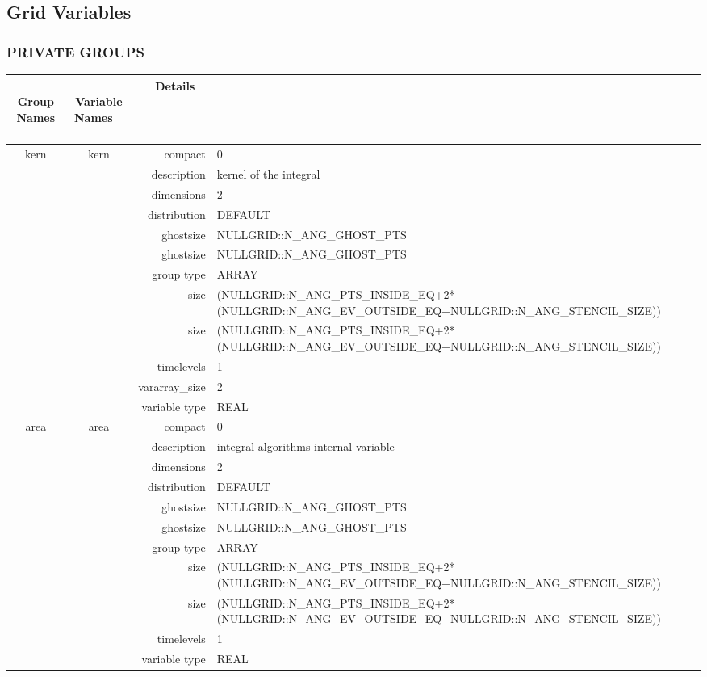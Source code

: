 \subsection*{Grid Variables}
\vspace{5mm}\subsubsection{PRIVATE GROUPS}

\vspace{5mm}

\begin{tabular*}{150mm}{|c|c@{\extracolsep{\fill}}|rl|} \hline 
~ {\bf Group Names} ~ & ~ {\bf Variable Names} ~  &{\bf Details} ~ & ~\\ 
\hline 
kern & kern & compact & 0 \\ 
 &  & description & kernel of the integral \\ 
 &  & dimensions & 2 \\ 
 &  & distribution & DEFAULT \\ 
 &  & ghostsize & NULLGRID::N\_ANG\_GHOST\_PTS \\ 
& ~ & ghostsize & NULLGRID::N\_ANG\_GHOST\_PTS \\ 
 &  & group type & ARRAY \\ 
 &  & size & (NULLGRID::N\_ANG\_PTS\_INSIDE\_EQ+2*(NULLGRID::N\_ANG\_EV\_OUTSIDE\_EQ+NULLGRID::N\_ANG\_STENCIL\_SIZE)) \\ 
& ~ & size & (NULLGRID::N\_ANG\_PTS\_INSIDE\_EQ+2*(NULLGRID::N\_ANG\_EV\_OUTSIDE\_EQ+NULLGRID::N\_ANG\_STENCIL\_SIZE)) \\ 
 &  & timelevels & 1 \\ 
 &  & vararray\_size & 2 \\ 
 &  & variable type & REAL \\ 
\hline 
area & area & compact & 0 \\ 
 &  & description & integral algorithms internal variable \\ 
 &  & dimensions & 2 \\ 
 &  & distribution & DEFAULT \\ 
 &  & ghostsize & NULLGRID::N\_ANG\_GHOST\_PTS \\ 
& ~ & ghostsize & NULLGRID::N\_ANG\_GHOST\_PTS \\ 
 &  & group type & ARRAY \\ 
 &  & size & (NULLGRID::N\_ANG\_PTS\_INSIDE\_EQ+2*(NULLGRID::N\_ANG\_EV\_OUTSIDE\_EQ+NULLGRID::N\_ANG\_STENCIL\_SIZE)) \\ 
& ~ & size & (NULLGRID::N\_ANG\_PTS\_INSIDE\_EQ+2*(NULLGRID::N\_ANG\_EV\_OUTSIDE\_EQ+NULLGRID::N\_ANG\_STENCIL\_SIZE)) \\ 
 &  & timelevels & 1 \\ 
 &  & variable type & REAL \\ 
\hline 
\end{tabular*} 



